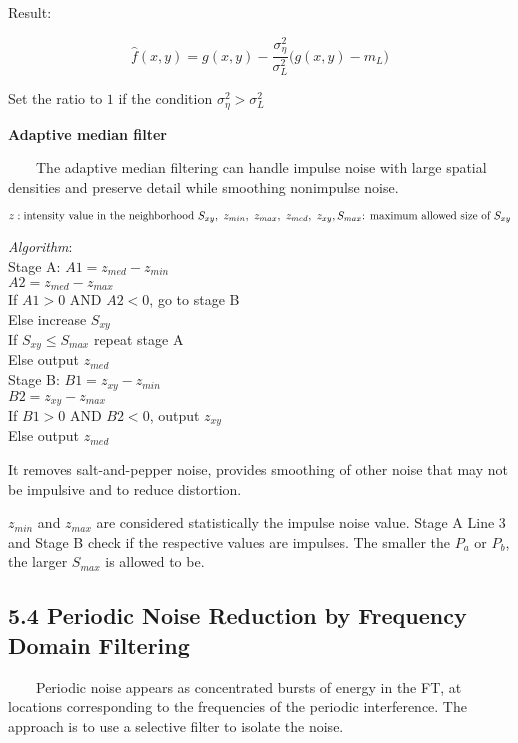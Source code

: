 \documentclass[]{article}
\begin{document}
Result:

\[\hat{f}(x,y)=g(x,y)-\dfrac{\sigma_\eta^2}{\sigma^2_L}\Big(g(x,y)-m_L\Big)\]

Set the ratio to \(1\) if the condition \(\sigma_\eta^2>\sigma_L^2\)

\textbf{Adaptive median filter}

\(\quad\quad\)The adaptive median filtering can handle impulse noise
with large spatial densities and preserve detail while smoothing
nonimpulse noise.

\[z:\text{intensity value in the neighborhood $S_{xy}$}, \ z_{min},\ z_{max},\ z_{med},\ z_{xy}, \\S_{max}\text{: maximum allowed size of $S_{xy}$}\]

\emph{Algorithm}: \\
 Stage A: \(A1 = z_{med}-z_{min}\)\\
 \(A2 = z_{med}-z_{max}\) \\
 If \(A1>0\) AND \(A2<0\), go to stage B\\
 Else increase \(S_{xy}\)\\
 If \(S_{xy}\leq S_{max}\) repeat stage A\\
 Else output \(z_{med}\)\\

 Stage B: \(B1=z_{xy}-z_{min}\)\\
 \(B2=z_{xy}-z_{max}\)\\
 If \(B1>0\) AND \(B2<0\), output \(z_{xy}\)\\
 Else output \(z_{med}\)

It removes salt-and-pepper noise, provides smoothing of other noise that
may not be impulsive and to reduce distortion.

\(z_{min}\) and \(z_{max}\) are considered statistically the impulse
noise value. Stage A Line 3 and Stage B check if the respective values
are impulses. The smaller the \(P_a\) or \(P_b\), the larger \(S_{max}\)
is allowed to be.

\subsection{5.4 Periodic Noise Reduction by Frequency Domain
Filtering}\label{header-n785}

\(\quad\quad\)Periodic noise appears as concentrated bursts of energy in
the FT, at locations corresponding to the frequencies of the periodic
interference. The approach is to use a selective filter to isolate the
noise.
\end{document}

